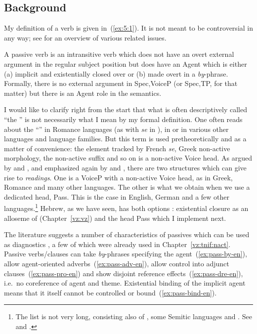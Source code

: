 	\subsection{Background}
My definition of a \textsc{} verb is given in~(\ref{ex:5:1}). It is not meant to be controversial in any way; see \cite{williams15} for an overview of various related issues.
 \begin{exe}
 \ex  \label{ex:5:1}
 \begin{xlist} 
 	\ex  A passive verb is an intransitive verb which does not have an overt external argument in the regular subject position but does have an Agent which is either (a) implicit and existentially closed over or (b) made overt in a \emph{by}-phrase. 
 	\ex  Formally, there is no external argument in Spec,VoiceP (or Spec,TP, for that matter) but there is an Agent role in the semantics. 
 \z
\z 

I would like to clarify right from the start that what is often descriptively called ``the '' is not necessarily what I mean by my formal definition. One often reads about the ``'' in Romance languages (as with \emph{se} in ), in  or in various other languages and language families. But this term is used pretheoretically and as a matter of convenience: the element tracked by French \emph{se}, Greek non-active morphology, the  non-active suffix \citep{lidz01} and so on is a non-active Voice head. As argued by \cite{alexiadoudoron12} and \citet[123]{layering15}, and emphasized again by \cite{spathasetal15} and \cite{kastnerzu17}, there are two structures which can give rise to  \emph{readings}. One is a VoiceP with a non-active Voice head, as in Greek, Romance and many other languages. The other is what we obtain when we use a dedicated  head, Pass. This is the case in English, German and a few other languages.\footnote{The list is not very long, consisting also of , some Semitic languages and . See \cite{klaiman91} and \cite{alexiadoudoron12}.} Hebrew, as we have seen, has both options \citep{alexiadoudoron12}: existential closure as an alloseme of {\vz} (Chapter~\ref{vz:vz}) and the head Pass which I implement next.

The literature suggests a number of characteristics of passives which can be used as diagnostics \citep{bakeretal89,sichel09,spathasetal15}, a few of which were already used in Chapter~\ref{vz:tnif:nact}. Passive verbs/clauses can take \emph{by}-phrases specifying the agent~(\ref{ex:pass-by-en}), allow agent-oriented adverbs~(\ref{ex:pass-adv-en}), allow control into adjunct clauses~(\ref{ex:pass-pro-en}) and show disjoint reference effects~(\ref{ex:pass-dre-en}), i.e.~no coreference of agent and theme. Existential binding of the implicit agent means that it itself cannot be controlled or bound~(\ref{ex:pass-bind-en}).


\end{xlist}
\end{exe}
